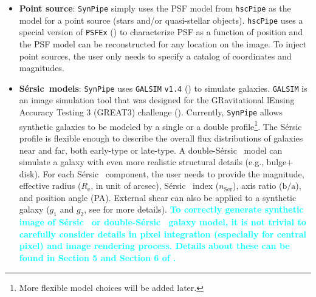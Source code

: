 \documentclass[useamsfonts]{pasj01}
\def\ser{{S\'{e}rsic\ }}
\def\hscpipe{\texttt{hscPipe}}
\def\synpipe{\texttt{SynPipe}}
\def\galsim{\texttt{G}{\scriptsize \texttt{AL}}\texttt{S}{\scriptsize \texttt{IM}}}
\newcommand{\song}[1]{\textcolor{cyan} {\textbf{#1}}}
\begin{document}
    \begin{itemize}

        \item \textbf{Point source}: 
            \synpipe{} simply uses the PSF model from \hscpipe{} as the model for
            a point source (stars and/or quasi-stellar objects).
            \hscpipe{} uses a special version of \texttt{PSFEx}
            (\citealt{Bertin2011, Bertin2013}) to characterize PSF as a function
            of position and the PSF model can be reconstructed for any location on 
            the image. 
            To inject point sources, the user only needs to specify a catalog of 
            coordinates and magnitudes.
            
        \item \textbf{\ser{}models}:
            \texttt{SynPipe} uses \galsim{} \texttt{v1.4} (\citealt{Rowe2015}) to
            simulate galaxies.
            \galsim{} is an image simulation tool that was designed for the 
            GRavitational lEnsing Accuracy Testing 3 (GREAT3) challenge
            (\citealt{Mandelbaum2014}). 
            Currently, \synpipe{} allows synthetic galaxies to be modeled by a
            single or a double \citet{Sersic1963}
            profile\footnote{More flexible model choices will be added later.}. 
            The \ser{} profile is flexible enough to describe the overall flux
            distributions of galaxies near and far, both early-type or late-type.
            A double-\ser{} model can simulate a galaxy with even more realistic
            structural details (e.g., bulge$+$disk).
            For each \ser{} component, the user needs to provide the magnitude,
            effective radius ($R_{\mathrm{e}}$, in unit of arcsec), \ser{} index
            ($n_{\mathrm{Ser}}$), axis ratio ($\mathrm{b}/\mathrm{a}$), and position
            angle (PA).
            External shear can also be applied to a synthetic galaxy ($g_1$ and
            $g_2$, see \citealt{Rowe2015} for more details).
            \song{ 
            To correctly generate synthetic image of \ser{} or double-\ser{} galaxy
            model, it is not trivial to carefully consider details in pixel 
            integration (especially for central pixel) and image rendering process.  
            Details about these can be found in Section 5 and Section 6 of 
            \citet{Rowe2015}.
            }
            

\end{itemize}
\end{document}
